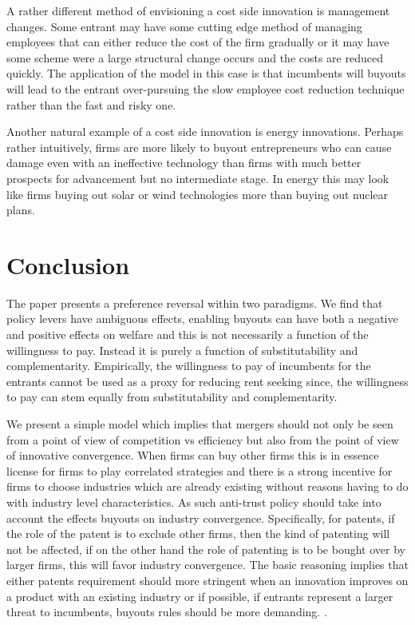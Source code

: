 \documentclass[11pt]{article}
\begin{document}
A rather different method of envisioning a cost side innovation is management changes. Some entrant may have some cutting edge method of managing employees that can either reduce the cost of the firm gradually or it may have some scheme were a large structural change occurs and the costs are reduced quickly. The application of the model in this case is that incumbents will buyouts will lead to the entrant over-pursuing the slow employee cost reduction technique rather than the fast and risky one.  

Another natural example of a cost side innovation is energy innovations. Perhaps rather intuitively, firms are more likely to buyout entrepreneurs who can cause damage even with an ineffective technology than firms with much better prospects for advancement but no intermediate stage. In energy this may look like firms buying out solar or wind technologies more than buying out nuclear plans.   



\section{Conclusion}


The paper presents a preference reversal within two paradigms. We find that policy levers have ambiguous effects, enabling buyouts can have both a negative and positive effects on welfare and this is not necessarily a function of the willingness to pay. Instead it is purely a function of substitutability and complementarity. Empirically, the willingness to pay of incumbents for the entrants cannot be used as a proxy for reducing rent seeking since, the willingness to pay can stem equally from substitutability and complementarity. 

We present a simple model which implies that mergers should not only be seen from a point of view of competition vs efficiency but also from the point of view of innovative convergence. When firms can buy other firms this is in essence license for firms to play correlated strategies and there is a strong incentive for firms to choose industries which are already existing without reasons having to do with industry level characteristics. As such anti-trust policy should take into account the effects buyouts on industry convergence. Specifically, for patents, if the role of the patent is to exclude other firms, then the kind of patenting will not be affected, if on the other hand the role of patenting is to be bought over by larger firms, this will favor industry convergence. The basic reasoning implies that either patents requirement should more stringent when an innovation improves on a product with an existing industry or if possible, if entrants represent a larger threat to incumbents, buyouts rules should be more demanding. . 
\end{document}
